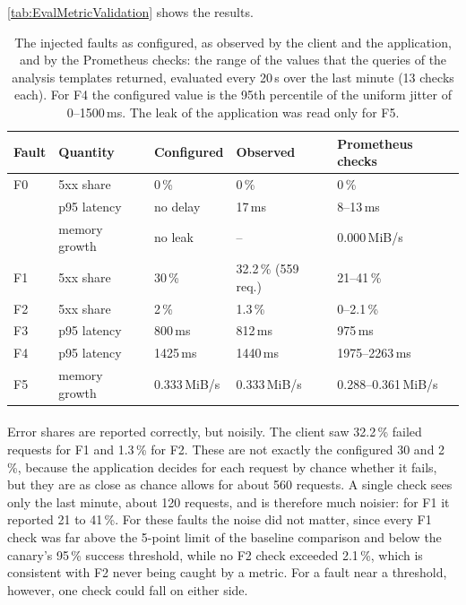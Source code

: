\autoref{tab:EvalMetricValidation} shows the results.

\begin{table}[ht]
	\footnotesize
	\centering
	\begin{tabular}{ l l l l l }
		\toprule
		Fault & Quantity & Configured & Observed & Prometheus checks \\
		\midrule
		F0 & 5xx share & 0\,\% & 0\,\% & 0\,\% \\
		& p95 latency & no delay & 17\,ms & 8--13\,ms \\
		& memory growth & no leak & -- & 0.000\,MiB/s \\
		\addlinespace
		F1 & 5xx share & 30\,\% & 32.2\,\% (559 req.) & 21--41\,\% \\
		F2 & 5xx share & 2\,\% & 1.3\,\% & 0--2.1\,\% \\
		\addlinespace
		F3 & p95 latency & 800\,ms & 812\,ms & 975\,ms \\
		F4 & p95 latency & 1425\,ms & 1440\,ms & 1975--2263\,ms \\
		\addlinespace
		F5 & memory growth & 0.333\,MiB/s & 0.333\,MiB/s & 0.288--0.361\,MiB/s \\
		\bottomrule
	\end{tabular}
	\caption{The injected faults as configured, as observed by the client and the application, and by the Prometheus checks: the range of the values that the queries of the analysis templates returned, evaluated every 20\,s over the last minute (13 checks each). For F4 the configured value is the 95th percentile of the uniform jitter of 0--1500\,ms. The leak of the application was read only for F5.}
    \label{tab:EvalMetricValidation}
\end{table}

\paragraph{} Error shares are reported correctly, but noisily. The client saw 32.2\,\% failed requests for F1 and 1.3\,\% for F2. These are not exactly the configured 30 and 2\,\%, because the application decides for each request by chance whether it fails, but they are as close as chance allows for about 560 requests. A single check sees only the last minute, about 120 requests, and is therefore much noisier: for F1 it reported 21 to 41\,\%. For these faults the noise did not matter, since every F1 check was far above the 5-point limit of the baseline comparison and below the canary's 95\,\% success threshold, while no F2 check exceeded 2.1\,\%, which is consistent with F2 never being caught by a metric. For a fault near a threshold, however, one check could fall on either side.

